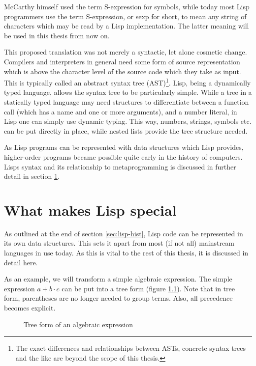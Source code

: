 \documentclass[a4paper,10pt,twoside]{report}
\begin{document}
McCarthy himself used the term S-expression for symbols, while today most Lisp
programmers use the term S-expression, or sexp for short, to mean any string of
characters which may be read by a Lisp implementation.  The latter meaning will
be used in this thesis from now on.

This proposed translation was not merely a syntactic, let alone cosmetic change.
Compilers and interpreters in general need some form of source representation
which is above the character level of the source code which they take as input.
This is typically called an abstract syntax tree (AST)\footnote{The exact
  differences and relationships between ASTs, concrete syntax trees and the like
  are beyond the scope of this thesis.}.  Lisp, being a dynamically typed
language, allows the syntax tree to be particularly simple.  While a tree in a
statically typed language may need structures to differentiate between a
function call (which has a name and one or more arguments), and a number
literal, in Lisp one can simply use dynamic typing.  This way, numbers, strings,
symbols etc. can be put directly in place, while nested lists provide the tree
structure needed.

As Lisp programs can be represented with data structures which Lisp provides,
higher-order programs became possible quite early in the history of computers.
Lisps syntax and its relationship to metaprogramming is discussed in further
detail in section \ref{sec:lisp-special}.

\chapter{What makes Lisp special}
\label{sec:lisp-special}

As outlined at the end of section \ref{sec:lisp-hist}, Lisp code can be
represented in its own data structures.  This sets it apart from most (if not
all) mainstream languages in use today. As this is vital to the rest of this
thesis, it is discussed in detail here.

As an example, we will transform a simple algebraic expression.  The simple
expression \(a + b \cdot c\) can be put into a tree form (figure
\ref{fig:simple-tree}).  Note that in tree form, parentheses are no longer
needed to group terms.  Also, all precedence becomes explicit.

\begin{figure}[h]
  \centering
  
  \caption{Tree form of an algebraic expression}
  \label{fig:simple-tree}
\end{figure}
\end{document}

